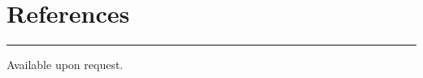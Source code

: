 \documentclass[10.5pt, oneside]{article}   	%
\begin{document}
{\color{Sectioncolour}
\section*{References}
\vspace{-3mm}
\noindent\rule{\linewidth}{0.6pt}}
Available upon request.
\end{document}
